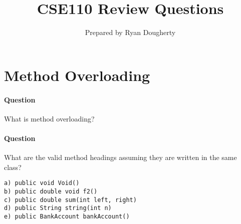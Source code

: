 \documentclass{article}
\title{CSE110 Review Questions}
\author{Prepared by Ryan Dougherty}
\date{}
\begin{document}
\maketitle

\section*{Method Overloading}


\setcounter{question_num}{1}
\paragraph{Question }
What is method overloading? 

\addtocounter{question_num}{1}
\paragraph{Question }
What are the valid method headings assuming they are written in the same class?
\begin{lstlisting}
a) public void Void()
b) public double void f2()
c) public double sum(int left, right)
d) public String string(int n)
e) public BankAccount bankAccount()
\end{lstlisting}
\end{document}

